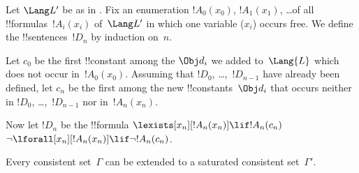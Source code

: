 \documentclass[../../../include/open-logic-section]{subfiles}
\begin{document}
\begin{defn}
Let $\Lang L'$ be as in .  Fix an enumeration
$!A_0(x_0)$, $!A_1(x_1)$, \dots of all !!{formula}s~$!A_i(x_i)$
of~$\Lang L'$ in which one variable ($x_i$) occurs free.  We define
the !!{sentence}s~$!D_n$ by induction on~$n$.

Let $c_0$ be the first !!{constant} among the $\Obj d_i$ we added
to~$\Lang{L}$ which does not occur in~$!A_0(x_0)$.  Assuming that
$!D_0$, \dots,~$!D_{n-1}$ have already been defined, let $c_n$ be the
first among the new !!{constant}s~$\Obj d_i$ that occurs neither in
$!D_0$, \dots,~$!D_{n-1}$ nor in~$!A_n(x_n)$.

Now let $!D_{n}$ be the !!{formula} 
{$\lexists[x_{n}][!A_{n}(x_{n})] \lif
  !A_{n}(c_{n})$}{$\lnot\lforall[x_{n}][!A_{n}(x_{n})] \lif \lnot
  !A_{n}(c_{n})$}.
\end{defn}

\begin{lem}
Every consistent set~$\Gamma$ can be extended to a saturated
consistent set~$\Gamma'$.
\end{lem}
\end{document}
